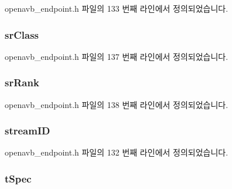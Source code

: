 openavb\+\_\+endpoint.\+h 파일의 133 번째 라인에서 정의되었습니다.

\subsubsection[{\texorpdfstring{sr\+Class}{srClass}}]{ sr\+Class}\hypertarget{structclient_stream__t_a80284f1ae795639368e9ed6a44109d84}{}\label{structclient_stream__t_a80284f1ae795639368e9ed6a44109d84}


openavb\+\_\+endpoint.\+h 파일의 137 번째 라인에서 정의되었습니다.

\subsubsection[{\texorpdfstring{sr\+Rank}{srRank}}]{ sr\+Rank}\hypertarget{structclient_stream__t_a9faa29fc50359ae52f04cfa689490b06}{}\label{structclient_stream__t_a9faa29fc50359ae52f04cfa689490b06}


openavb\+\_\+endpoint.\+h 파일의 138 번째 라인에서 정의되었습니다.

\subsubsection[{\texorpdfstring{stream\+ID}{streamID}}]{ stream\+ID}\hypertarget{structclient_stream__t_a989c1ccd88811e9926203a07d587bc21}{}\label{structclient_stream__t_a989c1ccd88811e9926203a07d587bc21}


openavb\+\_\+endpoint.\+h 파일의 132 번째 라인에서 정의되었습니다.

\subsubsection[{\texorpdfstring{t\+Spec}{tSpec}}]{ t\+Spec}\hypertarget{structclient_stream__t_ab928eca0e7b010a8cc3a80be5bc8adcc}{}\label{structclient_stream__t_ab928eca0e7b010a8cc3a80be5bc8adcc}


